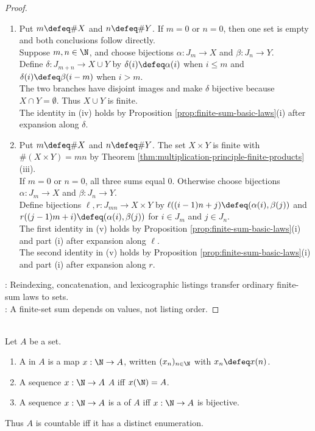\begin{proposition}
\begin{proof}
\begin{enumerate}[label=(\roman*)]
After the analogous expansions, the scalar-multiple identity holds by Proposition \ref{prop:finite-sum-basic-laws}(iii).
\item Put $m\defeq\#X$ and $n\defeq\#Y$. If $m=0$ or $n=0$, then one set is empty and both conclusions follow directly.\\
Suppose $m,n\in\N$, and choose bijections $\alpha:J_m\to X$ and $\beta:J_n\to Y$.\\
Define $\delta:J_{m+n}\to X\cup Y$ by $\delta(i)\defeq\alpha(i)$ when $i\leq m$ and $\delta(i)\defeq\beta(i-m)$ when $i>m$.\\
The two branches have disjoint images and make $\delta$ bijective because $X\cap Y=\emptyset$. Thus $X\cup Y$ is finite.\\
The identity in (iv) holds by Proposition \ref{prop:finite-sum-basic-laws}(i) after expansion along $\delta$.
\item Put $m\defeq\#X$ and $n\defeq\#Y$. The set $X\times Y$ is finite with $\#(X\times Y)=mn$ by Theorem \ref{thm:multiplication-principle-finite-products}(iii).\\
If $m=0$ or $n=0$, all three sums equal $0$. Otherwise choose bijections $\alpha:J_m\to X$ and $\beta:J_n\to Y$.\\
Define bijections $\ell,r:J_{mn}\to X\times Y$ by $\ell((i-1)n+j)\defeq(\alpha(i),\beta(j))$ and $r((j-1)m+i)\defeq(\alpha(i),\beta(j))$ for $i\in J_m$ and $j\in J_n$.\\
The first identity in (v) holds by Proposition \ref{prop:finite-sum-basic-laws}(i) and part (i) after expansion along $\ell$.\\
The second identity in (v) holds by Proposition \ref{prop:finite-sum-basic-laws}(i) and part (i) after expansion along $r$.
\end{enumerate}
: Reindexing, concatenation, and lexicographic listings transfer ordinary finite-sum laws to sets.\\
: A finite-set sum depends on values, not listing order.
\end{proof}
\end{proposition}

\begin{definition} \label{def:sequence-as-enumeration} \\
Let $A$ be a set.
\begin{enumerate}[label=(\roman*)]
\setlength{\itemsep}{0pt}
\item A  in $A$ is a map $x:\N\to A$, written $(x_n)_{n\in\N}$ with $x_n\defeq x(n)$.
\item A sequence $x:\N\to A$  $A$ iff $x(\N)=A$.
\item A sequence $x:\N\to A$ is a  of $A$ iff $x:\N\to A$ is bijective.
\end{enumerate}
Thus $A$ is countable iff it has a distinct enumeration.
\end{definition}

